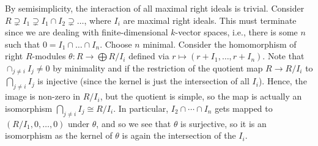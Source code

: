 By semisimplicity, the interaction of all maximal right ideals is trivial.
Consider
$R \supsetneq I_1 \supsetneq I_1\cap I_2\supsetneq\ldots$,
where $I_i$ are maximal right ideals. This must terminate since we are dealing
with finite-dimensional $k$-vector spaces, i.e., there is some $n$ such that
$0 = I_1\cap\ldots \cap I_n$. Choose $n$ minimal. Consider the homomorphism
of right $R$-modules $\theta\colon R\to \bigoplus R/I_i$ defined via
$r\mapsto (r+I_1, \ldots, r+I_n)$. Note that $\cap_{j\neq i} I_j\neq 0$ by
minimality and if the restriction of the quotient map $R \to R/I_i$ to
$\bigcap_{j\neq i} I_j$ is injective (since the kernel is just the intersection
of all $I_i$). Hence, the image is non-zero in $R/I_i$, but the quotient is
simple, so the map is actually an isomorphism $\bigcap_{j\neq i} I_j\cong R/I_i$.
In particular, $I_2\cap\cdots\cap I_n$ gets mapped to
$(R/I_1, 0, \ldots, 0)$ under $\theta$, and so we see that $\theta$ is
surjective, so it is an isomorphism as the kernel of $\theta$ is again
the intersection of the $I_i$.
